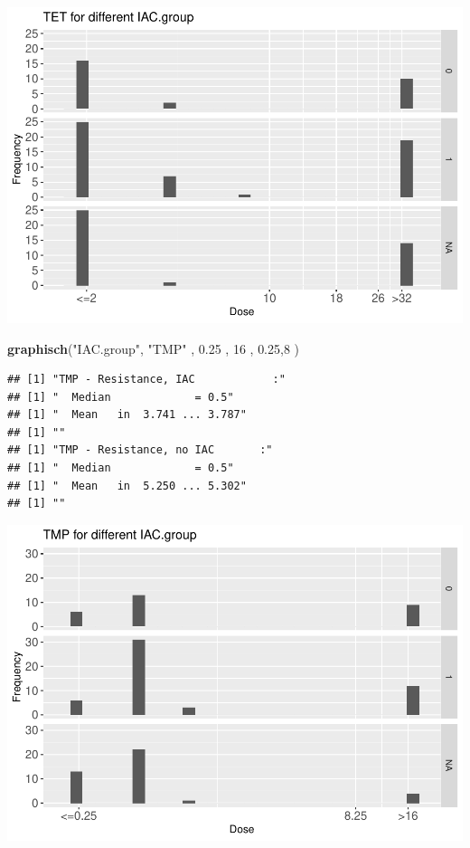 \documentclass[
]{article}
\newenvironment{Shaded}{\begin{snugshade}}{\end{snugshade}}
\newcommand{\DecValTok}[1]{\textcolor[rgb]{0.00,0.00,0.81}{#1}}
\newcommand{\FloatTok}[1]{\textcolor[rgb]{0.00,0.00,0.81}{#1}}
\newcommand{\KeywordTok}[1]{\textcolor[rgb]{0.13,0.29,0.53}{\textbf{#1}}}
\newcommand{\NormalTok}[1]{#1}
\newcommand{\StringTok}[1]{\textcolor[rgb]{0.31,0.60,0.02}{#1}}
\begin{document}
\includegraphics{Verteilungen_files/figure-latex/unnamed-chunk-15-1.pdf}

\begin{Shaded}
\begin{Highlighting}[]
   \KeywordTok{graphisch}\NormalTok{(}\StringTok{"IAC.group"}\NormalTok{, }\StringTok{"TMP"}\NormalTok{ , }\FloatTok{0.25}\NormalTok{ ,  }\DecValTok{16}\NormalTok{   ,   }\FloatTok{0.25}\NormalTok{,}\DecValTok{8}\NormalTok{    ) }
\end{Highlighting}
\end{Shaded}

\begin{verbatim}
## [1] "TMP - Resistance, IAC            :"
## [1] "  Median             = 0.5"
## [1] "  Mean   in  3.741 ... 3.787"
## [1] ""
## [1] "TMP - Resistance, no IAC       :"
## [1] "  Median             = 0.5"
## [1] "  Mean   in  5.250 ... 5.302"
## [1] ""
\end{verbatim}

\includegraphics{Verteilungen_files/figure-latex/unnamed-chunk-16-1.pdf}
\end{document}

